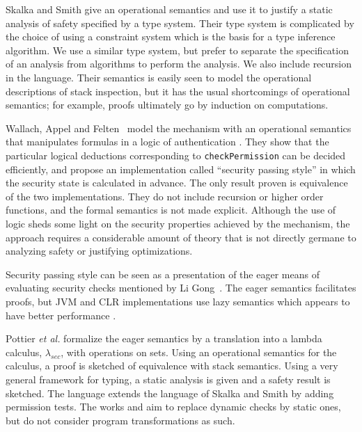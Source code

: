 \documentclass[submission,copyright,creativecommons]{eptcs}
\begin{document}
Skalka and Smith \cite{SkalkaS:ICFP00} give an operational semantics
and use it to justify a static analysis of safety specified by a type system.  
Their type system is complicated by the choice of using a constraint system
which is the basis for a type inference algorithm.  We use a similar type system, but 
prefer to separate the specification of an analysis from algorithms to perform the
analysis.  We also include recursion in the language.
Their semantics is easily seen to model the operational descriptions of stack
inspection, but it has the usual shortcomings of operational semantics; for example, proofs ultimately go by induction on computations. 


Wallach, Appel and Felten~\cite{WallachAF00} model the mechanism with
an operational semantics that manipulates formulas in a logic
of authentication \cite{AbadiBLP93}.  They show that the particular logical
deductions corresponding to \texttt{checkPermission} can be decided
efficiently, and propose an implementation called ``security passing
style'' in which the security state is calculated in advance.  The
only result proven is equivalence of the two implementations.  They do
not include recursion or higher order functions, and
the formal semantics is not made explicit.  Although the use of logic
sheds some light on the security properties achieved by the mechanism,
the approach requires a considerable amount of theory that is not
directly germane to analyzing safety or justifying optimizations.

Security passing style can be seen as a presentation of the eager
means of evaluating security checks mentioned by Li Gong~\cite{Gong99}.  
The eager semantics facilitates proofs, but JVM and CLR implementations
use lazy semantics which appears to have better performance \cite{Gong99,WallachAF00,LaMacchiaEtal02}.  

Pottier \emph{et al.} \cite{PottierSS05} formalize the eager semantics by a
translation into a lambda calculus, $\lambda_{\mathit{sec}}$, with operations on sets.  Using an operational semantics for the
calculus, a proof is sketched of equivalence with stack semantics.  Using a very
general framework for typing, a static analysis is given and a safety
result is sketched.  The language extends the language of 
Skalka and Smith \cite{SkalkaS:ICFP00} by adding permission tests.
The works \cite{SkalkaS:ICFP00} and \cite{PottierSS05} aim to replace dynamic checks by static ones, 
but do not consider program transformations as such.
\end{document}
